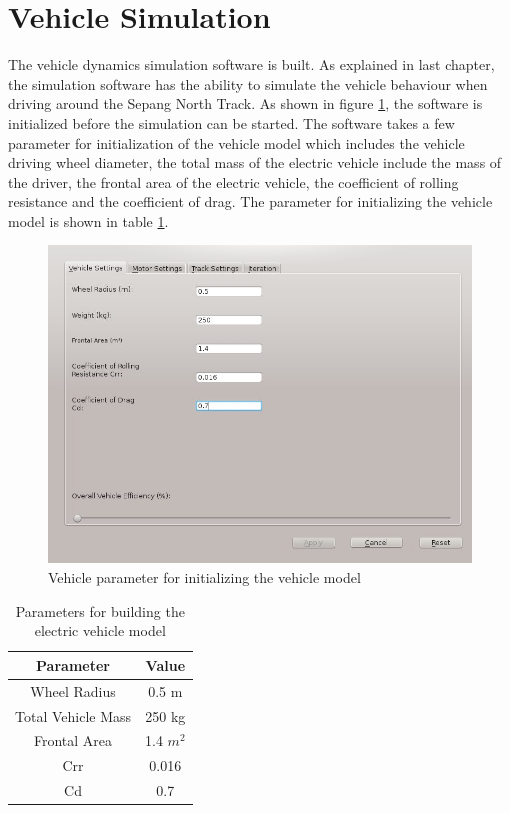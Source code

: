 \section{Vehicle Simulation}
The vehicle dynamics simulation software is built. As explained in last chapter, the simulation software has the ability to simulate the vehicle behaviour when driving around the Sepang North Track. As shown in figure \ref{im:vehicleSettings}, the software is initialized before the simulation can be started. The software takes a few parameter for initialization of the vehicle model which includes the vehicle driving wheel diameter, the total mass of the electric vehicle include the mass of the driver, the frontal area of the electric vehicle, the coefficient of rolling resistance and the coefficient of drag. The parameter for initializing the vehicle model is shown in table \ref{tb:vehicleModelParameter}.

\begin{figure}[htb]
	\centering
	\includegraphics[width=5in]{images/vehicle_settings.jpg}
	\caption{Vehicle parameter for initializing the vehicle model}
	\label{im:vehicleSettings}
\end{figure}

\begin{table}[htbp]
\begin{center}
\begin{tabular}{|c|c|}
\hline
\textbf{Parameter} & \textbf{Value} \\ \hline
Wheel Radius & 0.5 m \\ \hline
Total Vehicle Mass & 250 kg \\ \hline
Frontal Area & 1.4 $m^2$ \\ \hline
Crr & 0.016 \\ \hline
Cd & 0.7 \\ \hline
\end{tabular}
\end{center}
\caption{Parameters for building the electric vehicle model}
\label{tb:vehicleModelParameter}
\end{table}

